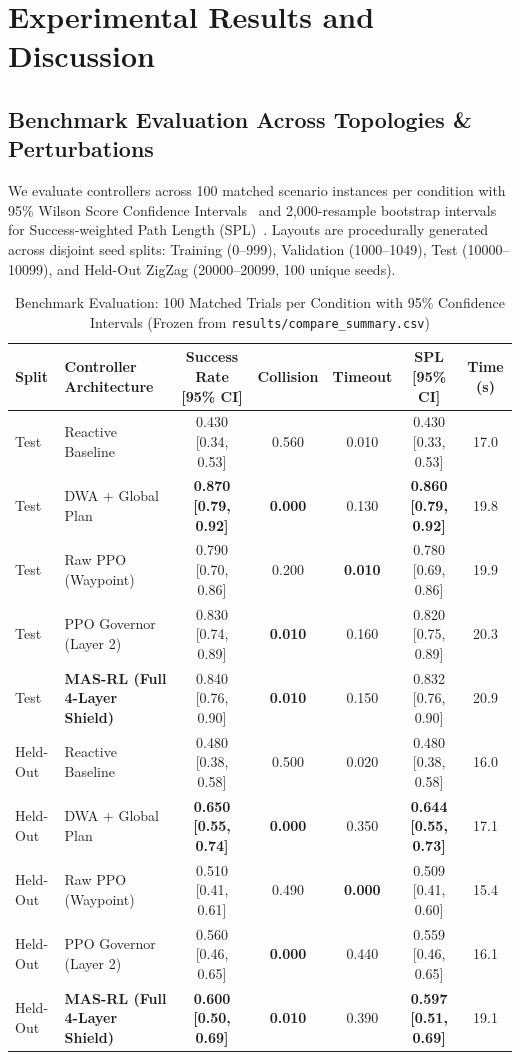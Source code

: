 \documentclass[runningheads]{llncs}
\begin{document}
\section{Experimental Results and Discussion}

\subsection{Benchmark Evaluation Across Topologies & Perturbations}
We evaluate controllers across 100 matched scenario instances per condition with 95\% Wilson Score Confidence Intervals~\cite{wilson1927probable} and 2,000-resample bootstrap intervals for Success-weighted Path Length (SPL)~\cite{anderson2018evaluation, efron1994bootstrap}. Layouts are procedurally generated across disjoint seed splits: Training (0--999), Validation (1000--1049), Test (10000--10099), and Held-Out ZigZag (20000--20099, 100 unique seeds).

\begin{table}[t]
\centering
\caption{Benchmark Evaluation: 100 Matched Trials per Condition with 95\% Confidence Intervals (Frozen from \texttt{results/compare\_summary.csv})}
\label{tab:benchmark}
\scriptsize
\begin{tabular}{llccccc}
\toprule
\textbf{Split} & \textbf{Controller Architecture} & \textbf{Success Rate [95\% CI]} & \textbf{Collision} & \textbf{Timeout} & \textbf{SPL [95\% CI]} & \textbf{Time (s)} \\
\midrule
Test & Reactive Baseline & 0.430 [0.34, 0.53] & 0.560 & 0.010 & 0.430 [0.33, 0.53] & 17.0 \\
Test & DWA + Global Plan & \textbf{0.870 [0.79, 0.92]} & \textbf{0.000} & 0.130 & \textbf{0.860 [0.79, 0.92]} & 19.8 \\
Test & Raw PPO (Waypoint) & 0.790 [0.70, 0.86] & 0.200 & \textbf{0.010} & 0.780 [0.69, 0.86] & 19.9 \\
Test & PPO Governor (Layer 2) & 0.830 [0.74, 0.89] & \textbf{0.010} & 0.160 & 0.820 [0.75, 0.89] & 20.3 \\
Test & \textbf{MAS-RL (Full 4-Layer Shield)} & 0.840 [0.76, 0.90] & \textbf{0.010} & 0.150 & 0.832 [0.76, 0.90] & 20.9 \\
\midrule
Held-Out & Reactive Baseline & 0.480 [0.38, 0.58] & 0.500 & 0.020 & 0.480 [0.38, 0.58] & 16.0 \\
Held-Out & DWA + Global Plan & \textbf{0.650 [0.55, 0.74]} & \textbf{0.000} & 0.350 & \textbf{0.644 [0.55, 0.73]} & 17.1 \\
Held-Out & Raw PPO (Waypoint) & 0.510 [0.41, 0.61] & 0.490 & \textbf{0.000} & 0.509 [0.41, 0.60] & 15.4 \\
Held-Out & PPO Governor (Layer 2) & 0.560 [0.46, 0.65] & \textbf{0.000} & 0.440 & 0.559 [0.46, 0.65] & 16.1 \\
Held-Out & \textbf{MAS-RL (Full 4-Layer Shield)} & \textbf{0.600 [0.50, 0.69]} & \textbf{0.010} & 0.390 & \textbf{0.597 [0.51, 0.69]} & 19.1 \\
\bottomrule
\end{tabular}
\end{table}
\end{document}
